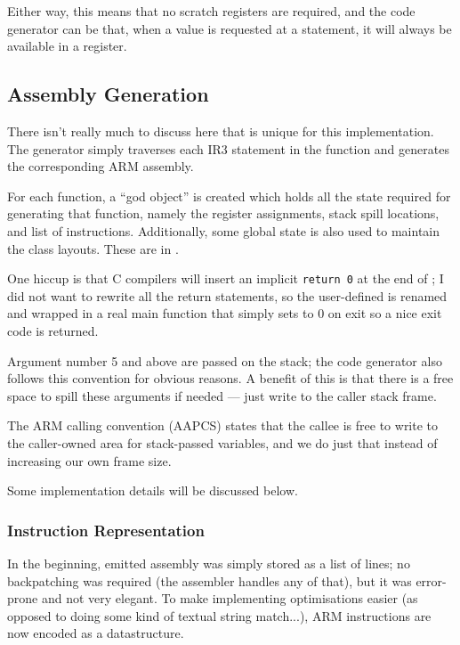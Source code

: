 \documentclass[12pt]{article}
\begin{document}
Either way, this means that no scratch registers are required, and the code generator can be  that, when a value
is requested at a statement, it will always be available in a register.




\subsection{Assembly Generation}

There isn't really much to discuss here that is unique for this implementation. The generator simply traverses each IR3 statement
in the function and generates the corresponding ARM assembly.

For each function, a \enquote{god object} is created which holds all the state required for generating that function, namely
the register assignments, stack spill locations, and list of instructions. Additionally, some global state is also used
to maintain the class layouts. These are in .

One hiccup is that C compilers will insert an implicit \texttt{return 0} at the end of ; I did not want to
rewrite all the return statements, so the user-defined  is renamed and wrapped in a real main function that
simply sets  to 0 on exit so a nice exit code is returned.

Argument number 5 and above are passed on the stack; the code generator also follows this convention for obvious reasons. A
benefit of this is that there is a free space to spill these arguments if needed --- just write to the caller stack frame.

The ARM calling convention (AAPCS) states that the callee is free to write to the caller-owned area for stack-passed
variables, and we do just that instead of increasing our own frame size.

Some implementation details will be discussed below.




\subsubsection{Instruction Representation}

In the beginning, emitted assembly was simply stored as a list of lines; no backpatching was required (the assembler handles any
of that), but it was error-prone and not very elegant. To make implementing optimisations easier (as opposed to doing some
kind of textual string match...), ARM instructions are now encoded as a datastructure.
\end{document}
